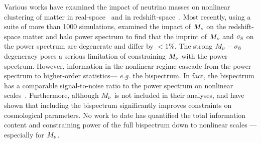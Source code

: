 Various works have examined the impact of neutrino masses on nonlinear clustering 
of matter in 
real-space~\citep[\emph{e.g.}][]{brandbyge2008, saito2008, wong2008, saito2009, viel2010, agarwal2011, bird2012, castorina2015, banerjee2016} 
and in redshift-space~\citep{marulli2011, castorina2015, upadhye2016}. Most recently, 
using a suite of more than 1000 simulations, \cite{villaescusa-navarro2018} 
examined the impact of $M_\nu$ on the redshift-space matter and halo power 
spectrum to find that the imprint of $M_\nu$ and $\sigma_8$ on the power spectrum are 
degenerate and differ by $< 1\%$. The strong $M_\nu$ -- $\sigma_8$ degeneracy
poses a serious limitation of constraining $M_\nu$ with the power spectrum. 
However, information in the nonlinear regime cascade from the power spectrum 
to higher-order statistics--- \emph{e.g.} the bispectrum. In fact, the 
bispectrum has a comparable signal-to-noise ratio to the power spectrum
on nonlinear scales~\citep{sefusatti2005, chan2017}. Furthermore, although $M_\nu$ 
is not included in their analyses, \cite{sefusatti2006} and \cite{yankelevich2019} 
have shown that including the bispectrum significantly improves constraints on 
cosmological parameters. %
No work to date has quantified the total information content and constraining 
power of the full bispectrum down to nonlinear scales --- especially for $M_\nu$. 

